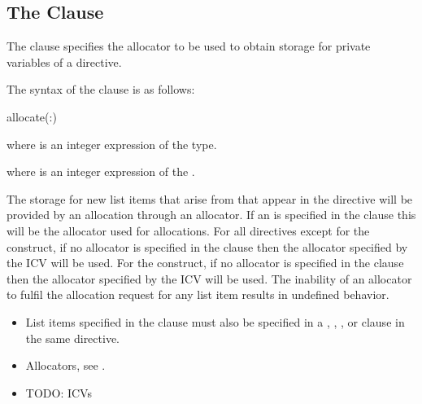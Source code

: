 \syntax

\descr

\subsection{The  Clause}
\label{subsec:allocate Clause}
\summary
The  clause specifies the allocator to be used to obtain storage for private variables of a directive.

\syntax

The syntax of the  clause is as follows:

\begin{boxedcode}
allocate(\plc{[allocator}:\plc{] list})
\end{boxedcode}

\ccppspecificstart
\begin{ccppspecific}
where  is an integer expression of the  type.
\end{ccppspecific}
\begin{fortranspecific}
where  is an integer expression of the  .
\end{fortranspecific}

\descr

The storage for new list items that arise from  that appear in the directive will be provided by an allocation through an allocator. If an  is specified in the clause this will be the allocator used for allocations. For all directives except for the  construct, if no allocator is specified in the clause then the allocator specified by the  ICV will be used. For the  construct, if no allocator is specified in the clause then the allocator specified by the  ICV will be used.  The inability of an allocator to fulfil the allocation request for any list item results in undefined behavior.

\restrictions
\begin{itemize}
\item List items specified in the  clause must also be specified in a , , ,  or 
       clause in the same directive.
\end{itemize}

\crossreferences
\begin{itemize}
\item Allocators, see .
\item TODO: ICVs
\end{itemize}

